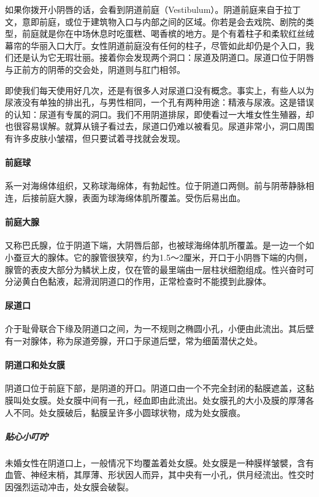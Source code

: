 \begin{enumerate}
如果你拨开小阴唇的话，会看到阴道前庭（Vestibulum）。阴道前庭来自于拉丁文，意即前庭，或位于建筑物入口与内部之间的区域。你若是会去戏院、剧院的类型，前庭就是你在中场休息时吃蛋糕、喝香槟的地方。是个有着柱子和柔软红丝绒幕帘的华丽入口大厅。女性阴道前庭没有任何的柱子，尽管如此却仍是个入口，我们还是认为它无瑕壮丽。接着你会发现两个洞口：尿道及阴道口。尿道口位于阴唇与正前方的阴蒂的交会处，阴道则与肛门相邻。

即使我们每天使用好几次，还是有很多人对尿道口没有概念。事实上，有些人以为尿液没有单独的排出孔，与男性相同，一个孔有两种用途：精液与尿液。这是错误的认知：尿道有专属的洞口。我们不用阴道排尿，即使看过一大堆女性生殖器，却也很容易误解。就算从镜子看过去，尿道口仍难以被看见。尿道非常小，洞口周围有许多皮肤小皱褶，但只要试着寻找就会发现。

\paragraph{前庭球}
系一对海绵体组织，又称球海绵体，有勃起性。位于阴道口两侧。前与阴蒂静脉相连，后接前庭大腺，表面为球海绵体肌所覆盖。受伤后易出血。

\paragraph{前庭大腺}
又称巴氏腺，位于阴道下端，大阴唇后部，也被球海绵体肌所覆盖。是一边一个如小蚕豆大的腺体。它的腺管很狭窄，约为1.5～2厘米，开口于小阴唇下端的内侧，腺管的表皮大部分为鳞状上皮，仅在管的最里端由一层柱状细胞组成。性兴奋时可分泌黄白色黏液，起滑润阴道口的作用，正常检查时不能摸到此腺体。

\paragraph{尿道口}
介于耻骨联合下缘及阴道口之间，为一不规则之椭圆小孔，小便由此流出。其后壁有一对腺体，称为尿道旁腺，开口于尿道后壁，常为细菌潜伏之处。

\paragraph{阴道口和处女膜}
阴道口位于前庭下部，是阴道的开口。阴道口由一个不完全封闭的黏膜遮盖，这黏膜叫处女膜。处女膜中间有一孔，经血即由此流出。处女膜孔的大小及膜的厚薄各人不同。处女膜破后，黏膜呈许多小圆球状物，成为处女膜痕。

\subparagraph{贴心小叮咛}
未婚女性在阴道口上，一般情况下均覆盖着处女膜。处女膜是一种膜样皱襞，含有血管、神经末梢，其厚薄、形状因人而异，其中央有一小孔，供月经流出。性交时因强烈运动冲击，处女膜会破裂。


\end{enumerate}
